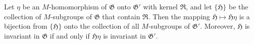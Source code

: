 Let $\eta$ be an $M$-homomorphism of $\mathfrak{G}$ onto $\mathfrak{G}'$ with kernel $\mathfrak{R}$, and let $\{\mathfrak{H}\}$ be the collection of $M$-subgroups of $\mathfrak{G}$ that contain $\mathfrak{R}$. Then the mapping $\mathfrak{H} \mapsto \mathfrak{H}\eta$ is a bijection from $\{\mathfrak{H}\}$ onto the collection of all $M$-subgroups of $\mathfrak{G}'$. Moreover, $\mathfrak{H}$ is invariant in $\mathfrak{G}$ if and only if $\mathfrak{H}\eta$ is invariant in $\mathfrak{G}'$.
